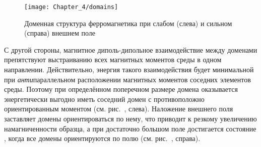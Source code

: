 %

\begin{wrapfigure}[]{r}{0.4\textwidth}
    \centering\texttt{[image: Chapter\_4/domains]}
    \caption{Доменная структура ферромагнетика при слабом (слева)
    и сильном (справа) внешнем поле}
\end{wrapfigure}

С другой стороны, магнитное диполь-дипольное взаимодействие между доменами препятствуют
выстраиванию всех магнитных моментов среды в одном направлении.
Действительно, энергия такого взаимодействия будет минимальной
при \emph{анти}параллельном расположении магнитных моментов соседних элементов среды.
Поэтому при определённом поперечном размере домена оказывается
энергетически выгодно иметь соседний домен с противоположно ориентированным моментом
(см. рис.~, слева).
Наложение внешнего поля заставляет домены ориентироваться
по нему, что приводит к резкому увеличению намагниченности образца, а при
достаточно большом поле достигается состояние ,
когда все домены ориентируются по полю (см. рис.~, справа).


